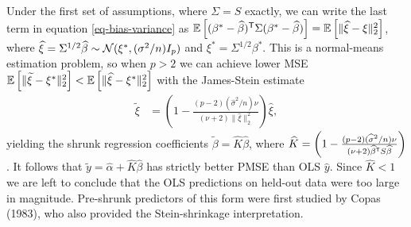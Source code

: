 \documentclass[main]{subfiles}
\begin{document}
Under the first set of assumptions, where $\Sigma = S$ exactly, we can write the last term in equation \eqref{eq-bias-variance} as $\mathbb{E}\left[ (\beta^*  -\widehat\beta)^\mathsf T \Sigma (\beta^*  -\widehat\beta)\right] = \mathbb{E}\left[\|\widehat\xi-\xi\|_2^2\right]$, where $\widehat\xi = \Sigma^{1/2}\widehat\beta\sim \mathcal{N}(\xi^*, (\sigma^2/n)I_p)$ and $\xi^* = \Sigma^{1/2}\beta^*$. This is a normal-means estimation problem, so when $p > 2$ we can achieve lower MSE $\mathbb{E}\left[\|\widetilde\xi-\xi^*\|_2^2\right] < \mathbb{E}\left[\|\widehat\xi-\xi^*\|_2^2\right]$ with the James-Stein estimate
\begin{align}
\label{eq-james-stein}
\widetilde\xi &= \left(1-\frac{(p-2)(\widehat\sigma^2/n)\nu}{(\nu+2)\|\widehat\xi\|_2^2}\right)\widehat\xi,
\end{align}
yielding the shrunk regression coefficients $\widetilde\beta = \widehat{K}\widehat\beta$, where $\widehat{K} = \left(1-\frac{(p-2)(\widehat\sigma^2/n)\nu}{(\nu+2)\widehat\beta^\mathsf T S\widehat\beta}\right)$. It follows that $\widetilde{y} = \widehat\alpha + \widehat{K}\widehat\beta$ has strictly better PMSE than OLS $\widehat{y}$. Since $\widehat{K} < 1$ we are left to conclude that the OLS predictions on held-out data were too large in magnitude. Pre-shrunk predictors of this form were first studied by Copas (1983), who also provided the Stein-shrinkage interpretation. \smallskip
\end{document}
